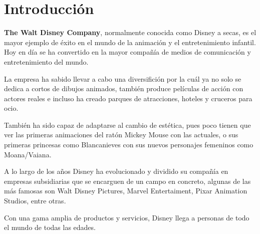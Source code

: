 \section{Introducción}
\textbf{The Walt Disney Company}, normalmente conocida como Disney a secas, es el mayor ejemplo de éxito en el mundo de la animación y el entretenimiento infantil. Hoy en día se ha convertido en la mayor compañía de medios de comunicación y entretenimiento del mundo.

La empresa ha sabido llevar a cabo una diversifición por la cuál ya no solo se dedica a cortos de dibujos animados, también produce películas de acción con actores reales e incluso ha creado parques de atracciones, hoteles y cruceros para ocio.

También ha sido capaz de adaptarse al cambio de estética, pues poco tienen que ver las primeras animaciones del ratón Mickey Mouse con las actuales, o sus primeras princesas como Blancanieves con sus nuevos personajes femeninos como Moana/Vaiana.

A lo largo de los años Disney ha evolucionado y dividido su compañía en empresas subsidiarias que se encarguen de un campo en concreto, algunas de las más famosas son Walt Disney Pictures, Marvel Entertaiment, Pixar Animation Studios, entre otras.

Con una gama amplia de productos y servicios, Disney llega a personas de todo el mundo de todas las edades.